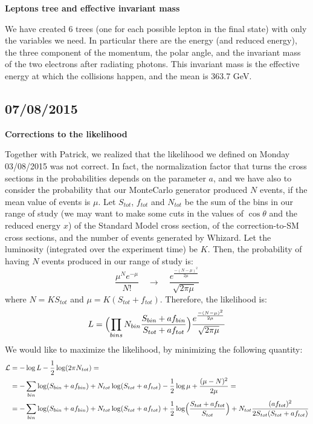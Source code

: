 \textbf{Leptons tree and effective invariant mass}

We have created 6 trees (one for each possible lepton in the final state) with only the variables we need. In particular there are the energy (and reduced energy), the three component of the momentum, the polar angle, and the invariant mass of the two electrons after radiating photons. This invariant mass is the effective energy at which the collisions happen, and the mean is 363.7 GeV. 

\subsection{07/08/2015}

\textbf{Corrections to the likelihood}

Together with Patrick, we realized that the likelihood we defined on Monday 03/08/2015 was not correct. In fact, the normalization factor that turns the cross sections in the probabilities depends on the parameter $a$, and we have also to consider the probability that our MonteCarlo generator produced $N$ events, if the mean value of events is $\mu$.
Let $S_{tot}$, $f_{tot}$ and $N_{tot}$ be the sum of the bins in our range of study (we may want to make some cuts in the values of $\cos\theta$ and the reduced energy $x$) of the Standard Model cross section, of the correction-to-SM cross sections, and the number of events generated by Whizard. Let the luminosity (integrated over the experiment time) be $K$. Then, the probability of having $N$ events produced in our range of study is:
\[
\frac{\mu^Ne^{-\mu}}{N!} \quad\rightarrow\quad \frac{e^{\frac{-(N-\mu)^2}{2\mu}}}{\sqrt{2\pi\mu}}
\]
where $N=KS_{tot}$ and $\mu = K(S_{tot}+f_{tot})$.
Therefore, the likelihood is:
\[
L = \Bigl(\prod_{bins}N_{bin}\frac{S_{bin}+af_{bin}}{S_{tot}+af_{tot}}\Bigr)\frac{e^{\frac{-(N-\mu)^2}{2\mu}}}{\sqrt{2\pi\mu}}
\]
We would like to maximize the likelihood, by minimizing the following quantity:
\begin{equation}
\begin{split}
\mathcal{L} &= -\log L -\frac{1}{2}\log(2\pi N_{tot}) =\\
&=- \sum_{bin}\log(S_{bin}+af_{bin})+N_{tot}\log(S_{tot}+af_{tot})-\frac{1}{2}\log\mu+\frac{(\mu-N)^2}{2\mu} =\\
&=- \sum_{bin}\log(S_{bin}+af_{bin})+N_{tot}\log(S_{tot}+af_{tot})+\frac{1}{2}\log\Bigl(\frac{S_{tot}+af_{tot}}{S_{tot}}\Bigr)+N_{tot}\frac{(af_{tot})^2}{2S_{tot}(S_{tot}+af_{tot})}
\end{split}
\end{equation}